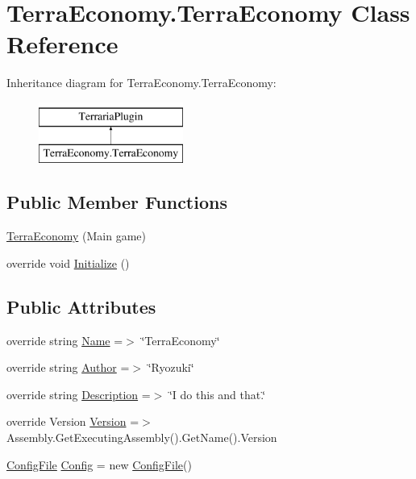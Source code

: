 \hypertarget{class_terra_economy_1_1_terra_economy}{}\section{Terra\+Economy.\+Terra\+Economy Class Reference}
\label{class_terra_economy_1_1_terra_economy}
Inheritance diagram for Terra\+Economy.\+Terra\+Economy\+:\begin{figure}[H]
\begin{center}
\leavevmode
\includegraphics[height=2.000000cm]{class_terra_economy_1_1_terra_economy}
\end{center}
\end{figure}
\subsection*{Public Member Functions}
\begin{DoxyCompactItemize}
\item 
\hyperlink{class_terra_economy_1_1_terra_economy_a898148271d776a94027e51b1a7692443}{Terra\+Economy} (Main game)
\item 
override void \hyperlink{class_terra_economy_1_1_terra_economy_ad3643300eefd76e8874400c91006945c}{Initialize} ()
\end{DoxyCompactItemize}
\subsection*{Public Attributes}
\begin{DoxyCompactItemize}
\item 
override string \hyperlink{class_terra_economy_1_1_terra_economy_ab1b8ca510a587dc42c7774b2310ce033}{Name} =$>$ \char`\"{}Terra\+Economy\char`\"{}
\item 
override string \hyperlink{class_terra_economy_1_1_terra_economy_af80f4275d26074aae690752f0d78e83b}{Author} =$>$ \char`\"{}Ryozuki\char`\"{}
\item 
override string \hyperlink{class_terra_economy_1_1_terra_economy_aecbfacf597f7088eb883f3ab704bad8a}{Description} =$>$ \char`\"{}I do this and that.\char`\"{}
\item 
override Version \hyperlink{class_terra_economy_1_1_terra_economy_a2ef91c0ab497fe3da92400cc3334c51f}{Version} =$>$ Assembly.\+Get\+Executing\+Assembly().Get\+Name().Version
\item 
\hyperlink{class_terra_economy_1_1_config_file}{Config\+File} \hyperlink{class_terra_economy_1_1_terra_economy_a7651c13a56e0229c4ac0333a6f6952df}{Config} = new \hyperlink{class_terra_economy_1_1_config_file}{Config\+File}()
\end{DoxyCompactItemize}
